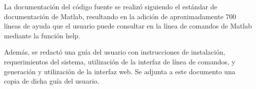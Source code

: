 \documentclass[12pt,bibliography=oldstyle,DIV=12,parskip=half-,titlepage]{scrartcl}
\begin{document}
La documentación del código fuente se realizó siguiendo el estándar de
documentación de Matlab, resultando en la adición de aproximadamente
700 líneas de ayuda que el usuario puede consultar en la línea de
comandos de Matlab mediante la función {\mono help}.

Además, se redactó una guía del usuario con instrucciones de
instalación, requerimientos del sistema, utilización de la interfaz de
línea de comandos, y generación y utilización de la interfaz web.  Se
adjunta a este documento una copia de dicha guía del usuario.
%
%
%
\renewcommand{\bibfont}{\normalfont\footnotesize}
\printbibliography
\end{document}
